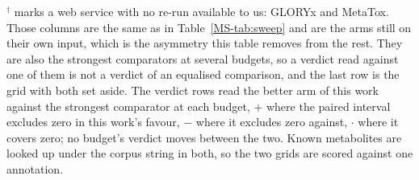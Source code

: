 \begin{table}[t]
\begin{threeparttable}
\begin{tablenotes}[flushleft]
\item $^{\dagger}$ marks a web service with no re-run available to us: GLORYx and MetaTox. Those columns are the same as in Table~\ref{MS-tab:sweep} and are the arms still on their own input, which is the asymmetry this table removes from the rest. They are also the strongest comparators at several budgets, so a verdict read against one of them is not a verdict of an equalised comparison, and the last row is the grid with both set aside. The verdict rows read the better arm of this work against the strongest comparator at each budget, $+$ where the paired interval excludes zero in this work's favour, $-$ where it excludes zero against, $\cdot$ where it covers zero; no budget's verdict moves between the two. Known metabolites are looked up under the corpus string in both, so the two grids are scored against one annotation.
\end{tablenotes}
\end{threeparttable}
\end{table}
